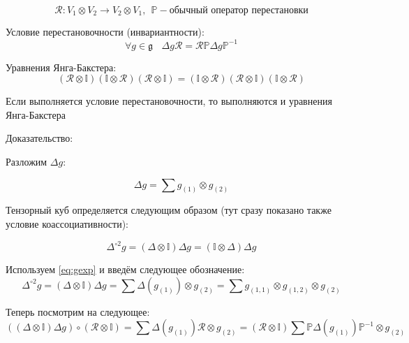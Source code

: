 \documentclass[12pt,a4paper]{article}
\begin{document}
\begin{equation}
    \mathcal{R}:V_1 \otimes V_2 \rightarrow V_2 \otimes V_1, \ \ \mathbb{P} -
    \text{обычный оператор перестановки}
\end{equation}

Условие перестановочности (инвариантности):
\begin{equation}
    \forall g \in \mathfrak{g} \ \ \ \ \Delta g \mathcal{R} = \mathcal{R}
    \mathbb{P} \Delta g \mathbb{P}^{-1}
\end{equation}

Уравнения Янга-Бакстера:
\begin{equation}
    (\mathcal{R} \otimes \mathbb{I})(\mathbb{I} \otimes \mathcal{R})
    (\mathcal{R} \otimes \mathbb{I}) = (\mathbb{I} \otimes \mathcal{R})
    (\mathcal{R} \otimes \mathbb{I}) (\mathbb{I} \otimes \mathcal{R})
    \label{eq:YB}
\end{equation}

\begin{theorem}
    Если выполняется условие перестановочности, то выполняются и
    уравнения Янга-Бакстера
\end{theorem}

Доказательство:

Разложим $\Delta g$:

\begin{equation}
    \Delta g = \sum g_{(1)} \otimes g_{(2)} 
    \label{eq:gexp}
\end{equation}

Тензорный куб определяется следующим образом (тут сразу показано также
условие коассоциативности):

\begin{equation}
    \Delta^{\circ 2} g = (\Delta \otimes \mathbb{I})\Delta g =
    (\mathbb{I} \otimes \Delta) \Delta g
    \label{eq:coprod-cube}
\end{equation}

Используем \eqref{eq:gexp} и введём следующее обозначение:
\begin{equation}
    \Delta^{\circ 2} g = (\Delta \otimes \mathbb{I})\Delta g = \sum \Delta (g_{(1)}) 
    \otimes g_{(2)} = \sum g_{(1,1)} \otimes g_{(1,2)} \otimes g_{(2)}
\end{equation}

Теперь посмотрим на следующее:
\begin{equation}
    ((\Delta \otimes \mathbb{I})\Delta g) \circ (\mathcal{R} \otimes \mathbb{I}) = 
    \sum \Delta(g_{(1)}) \mathcal{R} \otimes g_{(2)} =
    (\mathcal{R} \otimes \mathbb{I}) \sum \mathbb{P} \Delta(g_{(1)})
    \mathbb{P}^{-1} \otimes g_{(2)}
    \label{eq:trnsp-start}
\end{equation}
\end{document}
